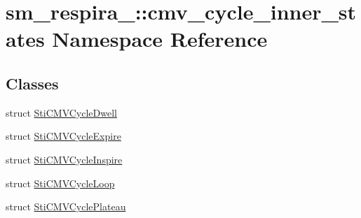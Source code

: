 \hypertarget{namespacesm__respira__1_1_1cmv__cycle__inner__states}{}\section{sm\+\_\+respira\+\_\+:\+:cmv\+\_\+cycle\+\_\+inner\+\_\+states Namespace Reference}
\label{namespacesm__respira__1_1_1cmv__cycle__inner__states}
\subsection*{Classes}
\begin{DoxyCompactItemize}
\item 
struct \hyperlink{structsm__respira__1_1_1cmv__cycle__inner__states_1_1StiCMVCycleDwell}{Sti\+C\+M\+V\+Cycle\+Dwell}
\item 
struct \hyperlink{structsm__respira__1_1_1cmv__cycle__inner__states_1_1StiCMVCycleExpire}{Sti\+C\+M\+V\+Cycle\+Expire}
\item 
struct \hyperlink{structsm__respira__1_1_1cmv__cycle__inner__states_1_1StiCMVCycleInspire}{Sti\+C\+M\+V\+Cycle\+Inspire}
\item 
struct \hyperlink{structsm__respira__1_1_1cmv__cycle__inner__states_1_1StiCMVCycleLoop}{Sti\+C\+M\+V\+Cycle\+Loop}
\item 
struct \hyperlink{structsm__respira__1_1_1cmv__cycle__inner__states_1_1StiCMVCyclePlateau}{Sti\+C\+M\+V\+Cycle\+Plateau}
\end{DoxyCompactItemize}
